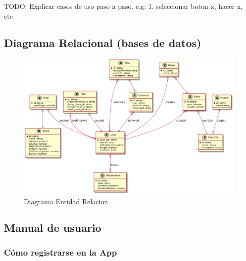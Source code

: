 \documentclass[12pt,a4paper]{article}
\begin{document}
TODO: Explicar casos de uso paso a paso. e.g: 1. seleccionar boton x, hacer x, etc

\newpage

\subsection{Diagrama Relacional (bases de datos)}

\begin{figure}[h]
 	\centering
	\includegraphics[width=\textwidth]{diagramaer}
	\caption{Diagrama Entidad Relacion}
\end{figure}

\clearpage

\subsection{Manual de usuario}

\subsubsection{Cómo registrarse en la App}
\end{document}
